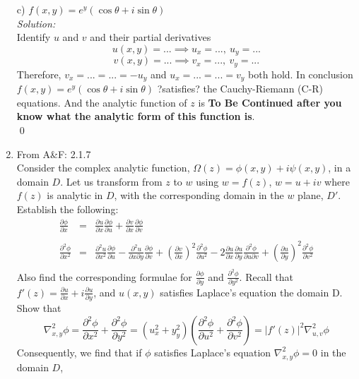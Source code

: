 \documentclass[10pt]{amsart}
\theoremstyle{nonumberplain}
\begin{document}
\begin{enumerate}[label={\bf {\arabic*}:}]
\noindent
c) $f(x, y) = e^y(\cos\theta + i\sin\theta)$ \\
\textit{Solution:} \\
Identify $u$ and $v$ and their partial derivatives
$$ u(x,y) = ... \implies u_x = ..., \: u_y = ...$$
$$v(x,y) = ... \implies v_x = ..., \: v_y = ...$$
Therefore, $v_x = ... = ... = - u_y$ and $u_x = ... = ... = v_y$ both hold.
In conclusion $f(x, y) = e^y(\cos\theta + i\sin\theta)$ ?satisfies? the Cauchy-Riemann (C-R) equations.
And the analytic function of $z$ is \textbf{To Be Continued after you know what the analytic form of this function is}. \\
\qed
\item From A\&F: 2.1.7 \\
Consider the complex analytic function, $\Omega(z) = \phi(x, y) + i\psi(x, y)$, in a domain $D$.
Let us transform from $z$ to $w$ using $w = f(z)$, $w = u + iv$ where $f(z)$ is analytic in $D$, with the corresponding domain in the $w$ plane, $D'$.
Establish the following: \\
\begin{eqnarray*}
\frac{\partial\phi}{\partial x} &=& \frac{\partial u}{\partial x} \frac{\partial\phi}{\partial u} + \frac{\partial v}{\partial x} \frac{\partial\phi}{\partial v} \\
\\
\frac{\partial^2\phi}{\partial x^2} &=& \frac{\partial^2 u}{\partial x^2} \frac{\partial\phi}{\partial u}
							- \frac{\partial^2 u}{\partial x \partial y} \frac{\partial\phi}{\partial v}
							+ \left(\frac{\partial v}{\partial x}\right)^2 \frac{\partial^2 \phi}{\partial u^2}
							- 2 \frac{\partial u}{\partial x} \frac{\partial u}{\partial y} \frac{\partial^2 \phi}{\partial u \partial v}
							+ \left(\frac{\partial u}{\partial y}\right)^2 \frac{\partial^2 \phi}{\partial v^2} \\
\end{eqnarray*}
Also find the corresponding formulae for $\frac{\partial \phi}{\partial y}$ and $\frac{\partial^2 \phi }{\partial y^2}$.
Recall that $f'(z) = \frac{\partial u }{\partial x} + i\frac{\partial u}{\partial y}$, and $u(x, y)$ satisfies Laplace's equation the domain D.
Show that
$$
\nabla_{x, y}^2 \phi = 
\frac{\partial^2\phi}{\partial x^2} + \frac{\partial^2 \phi }{\partial y^2} = 
\left(u_x^2 + y_y^2\right) \left(\frac{\partial^2\phi}{\partial u^2} + \frac{\partial^2 \phi }{\partial v^2}\right) =
\left| f'(z)\right|^2 \nabla_{u, v}^2 \phi
$$
Consequently, we find that if $\phi$ satisfies Laplace's equation $\nabla_{x, y}^2 \phi = 0$ in the domain $D$,

\end{enumerate}
\end{document}
